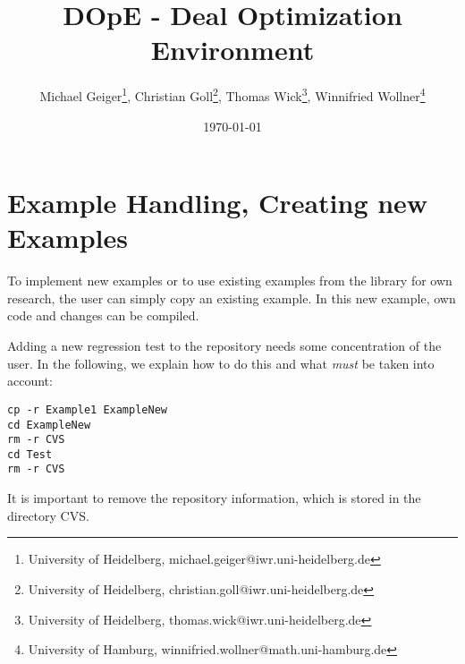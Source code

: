 \documentclass[a4paper,cleardoubleempty]{scrreprt}
\begin{document}
\title{DOpE - Deal Optimization Environment}
\author{
  Michael Geiger\thanks{University of Heidelberg, 
    {michael.geiger@iwr.uni-heidelberg.de}}, 
  Christian Goll\thanks{University of Heidelberg, 
    {christian.goll@iwr.uni-heidelberg.de}}, 
  Thomas Wick\thanks{University of Heidelberg, 
    {thomas.wick@iwr.uni-heidelberg.de}}, 
  Winnifried Wollner\thanks{University of Hamburg, 
    {winnifried.wollner@math.uni-hamburg.de}}
}



\date{\today}

\maketitle
\cleardoublepage\pagestyle{headings}
\tableofcontents
\cleardoublepage




\cleardoublepage

\chapter{Example Handling, Creating new Examples}
To implement new examples or to use existing examples 
from the library for own research, the user 
can simply copy an existing example. In this 
new example, own code and changes can be compiled.

Adding a new regression test to the repository 
needs some concentration of the user. In the 
following, we explain how to do this and what 
\textit{must} be taken into account:
\begin{verbatim}
cp -r Example1 ExampleNew
cd ExampleNew
rm -r CVS
cd Test
rm -r CVS
\end{verbatim}
It is important to remove the repository information,
which is stored in the directory CVS.
\end{document}
